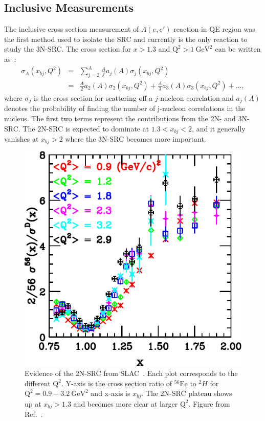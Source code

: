 \subsection{Inclusive Measurements}
 The inclusive cross section measurement of $A(e,e')$ reaction in QE region was the first method used to isolate the SRC and currently is the only reaction to study the 3N-SRC. The cross section for $x>1.3$ and $\mathrm{Q^{2}>1~GeV^{2}}$ can be written as~\cite{Frankfurt1988235}:
\begin{eqnarray}
  \sigma_{A}(x_{bj},Q^{2}) &=& \sum_{j=2}^{A}\frac{A}{j} a_{j}(A) \sigma_{j}(x_{bj},Q^{2}) \nonumber \\
  &=& \frac{A}{2}a_{2}(A)\sigma_{2}(x_{bj},Q^{2})+\frac{A}{3}a_{3}(A)\sigma_{3}(x_{bj},Q^{2})+...,
  \label{xs_src_inclusive}
\end{eqnarray}
where $\sigma_{j}$ is the cross section for scattering off a $j$-nucleon correlation and $a_{j}(A)$ denotes the probability of finding the number of j-nucleon correlations in the nucleus. The first two terms represent the contributions from the 2N- and 3N-SRC. The 2N-SRC is expected to dominate at $1.3<x_{bj}<2$, and it generally vanishes at $x_{bj}>2$ where the 3N-SRC becomes more important.
 \begin{figure}[!ht]
  \begin{center}
    \includegraphics[type=pdf,ext=.pdf,read=.pdf,width=0.60\linewidth]{./figures/physics/SLAC_2NSRC_xbj}
    \caption[Evidence of the 2N-SRC from SLAC]{\footnotesize{Evidence of the 2N-SRC from SLAC~\cite{SLAC_Measurement_PRC.48.2451}. Each plot corresponds to the different $\mathrm{Q^{2}}$. Y-axis is the cross section ratio of $\mathrm{^{56}Fe}$ to $^{2}H$ for $\mathrm{Q^{2}=0.9-3.2~GeV^{2}}$ and x-axis is $x_{bj}$. The 2N-SRC plateau shows up at $x_{bj}>1.3$ and becomes more clear at larger $\mathrm{Q^{2}}$. Figure from Ref.~\cite{SLAC_Measurement_PRC.48.2451}.}}
    \label{SLAC_2NSRC_xbj}
  \end{center}
\end{figure}

